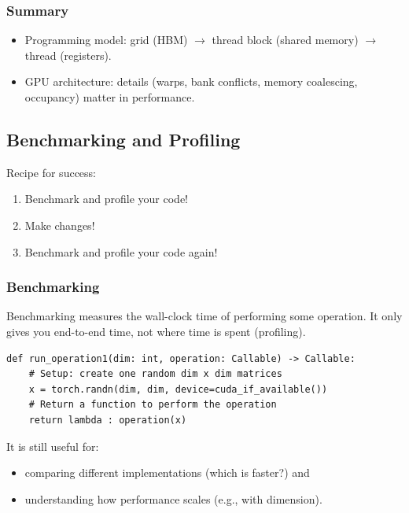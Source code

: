 \documentclass[12pt,twoside]{article}
\begin{document}
\subsubsection*{Summary}

\begin{itemize}
    \item Programming model: grid (HBM) \(\to\) thread block (shared memory) \(\to\) thread (registers).
    \item GPU architecture: details (warps, bank conflicts, memory coalescing, occupancy) matter in performance.
\end{itemize}

\subsection*{Benchmarking and Profiling}

Recipe for success:

\begin{enumerate}
    \item Benchmark and profile your code!
    \item Make changes!
    \item Benchmark and profile your code again!
\end{enumerate}

\subsubsection*{Benchmarking}

Benchmarking measures the wall-clock time of performing some operation. It only gives you end-to-end time, not where time is spent (profiling). 

\begin{verbatim}
def run_operation1(dim: int, operation: Callable) -> Callable:
    # Setup: create one random dim x dim matrices
    x = torch.randn(dim, dim, device=cuda_if_available())
    # Return a function to perform the operation
    return lambda : operation(x)
\end{verbatim}

It is still useful for:

\begin{itemize}
    \item comparing different implementations (which is faster?) and
    \item understanding how performance scales (e.g., with dimension).
\end{itemize}
\end{document}
